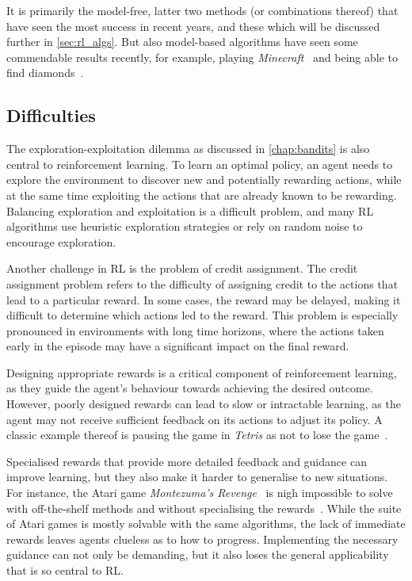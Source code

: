 It is primarily the model-free, latter two methods (or combinations thereof) that have seen the most success in recent years, and these which will be discussed further in \cref{sec:rl_algs}.
But also model-based algorithms have seen some commendable results recently, for example, playing \textit{Minecraft}~\autocite{minecraft} and being able to find diamonds~\autocite{hafner2023}.


\subsection{Difficulties}
\label{sec:difficulties}
The exploration-exploitation dilemma as discussed in \cref{chap:bandits} is also central to reinforcement learning.
To learn an optimal policy, an agent needs to explore the environment to discover new and potentially rewarding actions, while at the same time exploiting the actions that are already known to be rewarding.
Balancing exploration and exploitation is a difficult problem, and many RL algorithms use heuristic exploration strategies or rely on random noise to encourage exploration.

Another challenge in RL is the problem of credit assignment.
The credit assignment problem refers to the difficulty of assigning credit to the actions that lead to a particular reward.
In some cases, the reward may be delayed, making it difficult to determine which actions led to the reward.
This problem is especially pronounced in environments with long time horizons, where the actions taken early in the episode may have a significant impact on the final reward.

Designing appropriate rewards is a critical component of reinforcement learning, as they guide the agent's behaviour towards achieving the desired outcome.
However, poorly designed rewards can lead to slow or intractable learning, as the agent may not receive sufficient feedback on its actions to adjust its policy.
A classic example thereof is pausing the game in \textit{Tetris} as not to lose the game~\autocite{murphy2013}.

Specialised rewards that provide more detailed feedback and guidance can improve learning, but they also make it harder to generalise to new situations.
For instance, the Atari game \textit{Montezuma's Revenge}~\autocite{montezuma} is nigh impossible to solve with off-the-shelf methods and without specialising the rewards~\autocite{salimans2018}.
While the suite of Atari games is mostly solvable with the same algorithms, the lack of immediate rewards leaves agents clueless as to how to progress.
Implementing the necessary guidance can not only be demanding, but it also loses the general applicability that is so central to RL.

